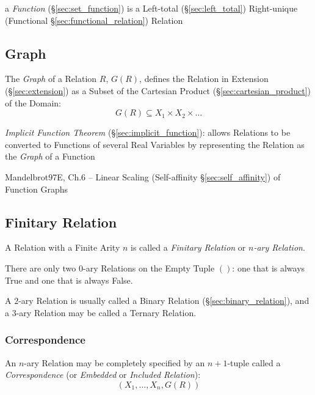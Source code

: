 \fist a \emph{Function} (\S\ref{sec:set_function}) is a Left-total
(\S\ref{sec:left_total}) Right-unique (Functional
\S\ref{sec:functional_relation}) Relation




\subsection{Graph}\label{sec:relation_graph}

The \emph{Graph} of a Relation $R$, $G(R)$, defines the Relation in
Extension (\S\ref{sec:extension}) as a Subset of the Cartesian Product
(\S\ref{sec:cartesian_product}) of the Domain:
\[
  G(R) \subseteq X_1 \times X_2 \times \ldots
\]

\fist \emph{Implicit Function Theorem} (\S\ref{sec:implicit_function}): allows
Relations to be converted to Functions of several Real Variables by representing
the Relation as the \emph{Graph} of a Function

Mandelbrot97E, Ch.6 -- Linear Scaling (Self-affinity \S\ref{sec:self_affinity})
of Function Graphs



\subsection{Finitary Relation}\label{sec:finitary_relation}

A Relation with a Finite Arity $n$ is called a \emph{Finitary
  Relation} or \emph{$n$-ary Relation}.

There are only two $0$-ary Relations on the Empty Tuple $()$: one that
is always True and one that is always False.

A $2$-ary Relation is usually called a Binary Relation
(\S\ref{sec:binary_relation}), and a $3$-ary Relation may be called a
Ternary Relation.



\subsubsection{Correspondence}\label{sec:correspondence}

An $n$-ary Relation may be completely specified by an $n + 1$-tuple
called a \emph{Correspondence} (or \emph{Embedded} or \emph{Included
  Relation}):
\[
  (X_1, \ldots, X_n, G(R))
\]



